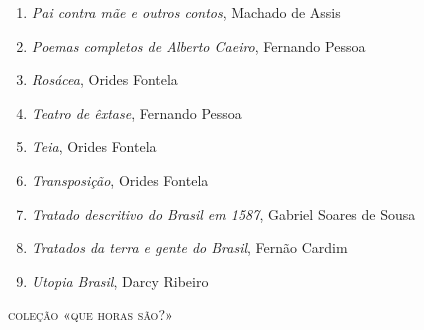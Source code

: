 \begin{enumerate}
\item \textit{Pai contra mãe e outros contos}, Machado de Assis
\item \textit{Poemas completos de Alberto Caeiro}, Fernando Pessoa
\item \textit{Rosácea}, Orides Fontela
\item \textit{Teatro de êxtase}, Fernando Pessoa
\item \textit{Teia}, Orides Fontela
\item \textit{Transposição}, Orides Fontela
\item \textit{Tratado descritivo do Brasil em 1587}, Gabriel Soares de Sousa
\item \textit{Tratados da terra e gente do Brasil}, Fernão Cardim 
\item \textit{Utopia Brasil}, Darcy Ribeiro
\end{enumerate}


%
%



\medskip
{\large\textsc{coleção «que horas são?»}}

